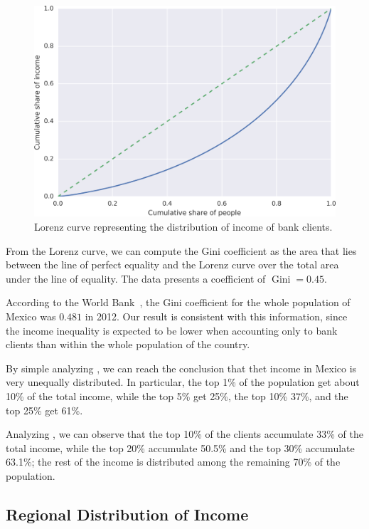 \begin{figure}
\centering
\includegraphics[width=0.9\columnwidth]{figures/cumulative_income.png}
\caption{Lorenz curve representing the distribution of income of bank clients.}
\label{fig:lorenz}
\end{figure}

From the Lorenz curve, we can compute the Gini coefficient as the area that lies between the line of perfect equality and the Lorenz curve over the total area under the line of equality. The data presents a coefficient of $\operatorname{Gini} = 0.45$.

According to the World Bank~\cite{world_bank}, the Gini coefficient for the whole population of Mexico was $0.481$ in 2012. Our result is consistent with this information, since the income inequality is expected to be lower when accounting only to bank clients than within the whole population of the country.

By simple analyzing , we can reach the conclusion that thet income in Mexico is very unequally distributed. In particular, the top 1\% of the population get about 10\% of the total income, while the top 5\% get 25\%, the top 10\% 37\%, and the top 25\% get 61\%.

Analyzing , we can observe that the top 10\% of the clients accumulate 33\% of the total income, while the top 20\% accumulate 50.5\% and the top 30\% accumulate 63.1\%; the rest of the income is distributed among the remaining 70\% of the population.

\subsection{Regional Distribution of Income}

